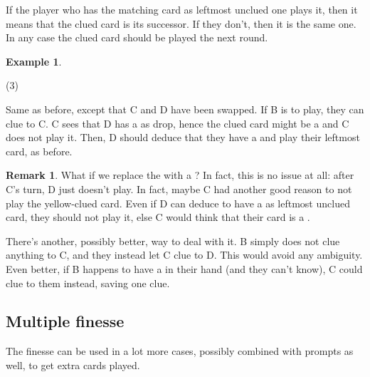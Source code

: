 \documentclass[a4paper]{article}
\theoremstyle{plain}
\theoremstyle{definition}
\newtheorem{remark}[theorem]{Remark}
\newtheorem{example}[theorem]{Example}
\begin{document}
If the player who has the matching card as leftmost unclued one plays it, then it means that the clued card is its successor. If they don't, then it is the same one. In any case the clued card should be played the next round.

\begin{example}
	\hfill
	\begin{tasks}(3)
		\task[+]      
		\task[A]    
		\task[B]    
		\task[C]    
		\task[D]    
		\task[E]    
	\end{tasks}
	
	Same as before, except that C and D have been swapped. If B is to play, they can clue  to C. C sees that D has a  as drop, hence the clued card might be a  and C does not play it. Then, D should deduce that they have a  and play their leftmost card, as before.
\end{example}

\begin{remark}
	What if we replace the  with a ? In fact, this is no issue at all: after C's turn, D just doesn't play. In fact, maybe C had another good reason to not play the yellow-clued card. Even if D can deduce to have a  as leftmost unclued card, they should not play it, else C would think that their card is a .
	
	There's another, possibly better, way to deal with it. B simply does not clue anything to C, and they instead let C clue  to D. This would avoid any ambiguity. Even better, if B happens to have a  in their hand (and they can't know), C could clue  to them instead, saving one clue.
\end{remark}

\subsection{Multiple finesse}

The finesse can be used in a lot more cases, possibly combined with prompts as well, to get extra cards played.
\end{document}
